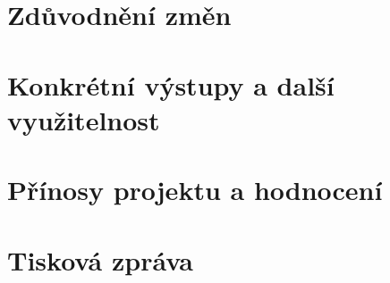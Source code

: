 \documentclass[a4paper,11pt]{article}
\begin{document}



\section{Zdůvodnění změn}





\section{Konkrétní výstupy a další využitelnost}







\section{Přínosy projektu a hodnocení}



\section{Tisková zpráva}
\end{document}
